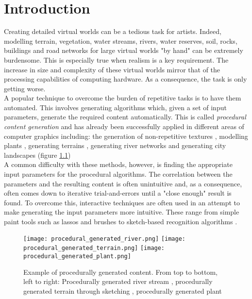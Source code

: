 
\chapter{Introduction}
\par
Creating detailed virtual worlds can be a tedious task for artists. Indeed, modelling terrain, vegetation, water streams, rivers, water reserves, soil, rocks, buildings and road networks for large virtual worlds "by hand" can be extremely burdensome. This is especially true when realism is a key requirement. The increase in size and complexity of these virtual worlds mirror that of the processing capabilities of computing hardware. As a consequence, the task is only getting worse.\\

A popular technique to overcome the burden of repetitive tasks is to have them automated. This involves generating algorithms which, given a set of input parameters, generate the required content automatically. This is called \textit{procedural content generation} and has already been successfully applied in different areas of computer graphics including: the generation of non-repetitive textures \cite{Efros1999,Liang2001,Wei2009}, modelling plants \cite{Boudon2012,Fourcaud2008,Guo2011,Lewis1999}, generating terrains \cite{Smelik2009,Gain2009,Doran2010}, generating river networks \cite{Derzapf2011,Emilien} and generating city landscapes \cite{Gain,Kelly2007,Parish2001} (figure \ref{Example of procedurally generated content}) \\
A common difficulty with these methods, however, is finding the appropriate input parameters for the procedural algorithms. The correlation between the parameters and the resulting content is often unintuitive and, as a consequence, often comes down to iterative trial-and-errors until a "close enough" result is found. To overcome this, interactive techniques are often used in an attempt to make generating the input parameters more intuitive. These range from simple paint tools such as lassos and brushes \cite{Emilien} to sketch-based recognition algorithms \cite{Gain2009}. \\

\begin{figure}[h]
  \centering
	\texttt{[image: procedural\_generated\_river.png]}
	\texttt{[image: procedural\_generated\_terrain.png]}
	\texttt{[image: procedural\_generated\_plant.png]}
	\caption{Example of procedurally generated content. From top to bottom, left to right: Procedurally generated river stream \cite{Derzapf2011}, procedurally generated terrain through sketching \cite{Gain2009}, procedurally generated plant \cite{Soler2001}}
	\label{Example of procedurally generated content}
\end{figure}

